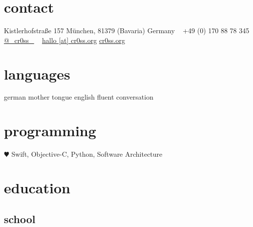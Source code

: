 \documentclass[]{friggeri-cv} %
\begin{document}


\begin{aside} %
\section{contact}
Kistlerhofstraße 157
M\"{u}nchen, 81379 (Bavaria)
Germany
~
+49 (0) 170 88 78 345
\href{https://twitter.com/_cr0ss_}{@\_cr0ss\_}
~
\href{mailto:hallo@cr0ss.org}{hallo [at] cr0ss.org}
\href{https://cr0ss.org}{cr0ss.org}
\section{languages}
german mother tongue
english fluent conversation
\section{programming}
{\color{red} $\varheartsuit$} Swift,
Objective-C, Python,
Software Architecture
\end{aside}


\section{education}

\subsection{school}
\end{document}

